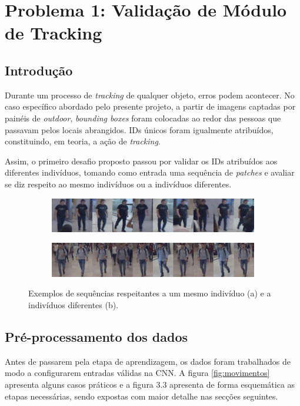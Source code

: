 \chapter{Problema 1: Validação de Módulo de Tracking}
\label{chap:val_ids}

\section{Introdução}
\label{chap3:sec:intro}
Durante um processo de \textit{tracking} de qualquer objeto, erros podem acontecer. No caso específico abordado pelo presente projeto, a partir de imagens captadas por painéis de \textit{outdoor}, \textit{bounding boxes} foram colocadas ao redor das pessoas que passavam pelos locais abrangidos. IDs únicos foram igualmente atribuídos, constituindo, em teoria, a ação de \textit{tracking}.

\noindent Assim, o primeiro desafio proposto passou por validar os IDs atribuídos aos diferentes indivíduos, tomando como entrada uma sequência de \textit{patches} e avaliar se diz respeito ao  mesmo indivíduos ou a indivíduos diferentes.

\begin{figure} [h]
  \centering
  \begin{subfigure}{385pt}
    \centering\includegraphics[width=385pt]{capa.jpg}
    \caption{}
  \end{subfigure}
  \begin{subfigure}{385pt}
    \centering\includegraphics[width=385pt]{capa2.jpg}
    \caption{}
  \end{subfigure}
  \caption{Exemplos de sequências respeitantes a um mesmo indivíduo (a) e a indivíduos diferentes (b).}
  \label{fig:imagem_exemplo}
\end{figure}

\section{Pré-processamento dos dados}
\label{chap3:sec:metodo}
Antes de passarem pela etapa de aprendizagem, os dados foram trabalhados de modo a configurarem entradas válidas na \ac{CNN}. A figura \ref{fig:movimentos} apresenta alguns casos práticos e a figura 3.3 apresenta de forma esquemática as etapas necessárias, sendo expostas com maior detalhe nas secções seguintes. \newline

